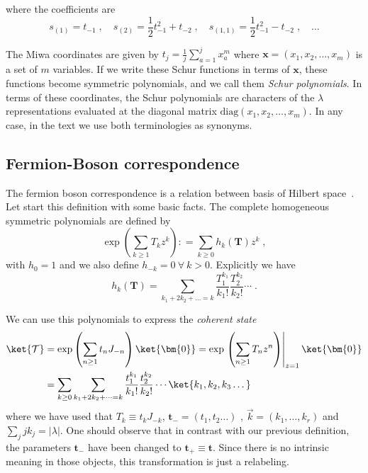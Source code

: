 where the coefficients are
\begin{equation}
s_{(1)}=t_{-1}\; , \quad s_{(2)}=\frac{1}{2}t_{-1}^2 + t_{-2} \; ,\quad s_{(1,1)}
=\frac{1}{2}t_{-1}^2- t_{-2}\; ,\quad  \dots
\end{equation}

The Miwa coordinates are given by \(t_j = \frac{1}{j}\sum_{a = 1}^j
x_a^m\) where \(\bm{x} = (x_1, x_2, \dots, x_m)\) is a set of \(m\)
variables. If we write these Schur functions in terms of \(\bm{x}\),
these functions become symmetric polynomials, and we call them
\emph{Schur polynomials}. In terms of these coordinates, the Schur
polynomials are characters of the \(\lambda\) representations
evaluated at the diagonal matrix \(\mathrm{diag}(x_1, x_2, \dots,
x_m)\). In any case, in the text we use both terminologies as
synonyms.


\subsection{Fermion-Boson correspondence}

The fermion boson correspondence is a relation between basis of
Hilbert space~\cite{Cordes:1994fc, Marino:2005sj}. Let start this
definition with some basic facts. The complete homogeneous symmetric
polynomials are defined by
\begin{equation}
  \label{eq:com-hom-sym-pol}
\exp\left(\sum_{k\geq 1} T_k z^k\right): = \sum_{k\geq 0} h_k(\bm{T}) z^k \; ,
\end{equation}
with \(h_0=1\) and we also define \(h_{-k}=0\  \forall\ k>0\). Explicitly we have 
\begin{equation}
  h_k(\bm{T}) = \sum_{k_1+2k_2 +\dots = k}\frac{T_1^{k_1}}{k_1!} \frac{T_2^{k_2}}{k_2!}\cdots
  \; .
\end{equation}	

We can use this polynomials to express the \emph{coherent state}
\begin{equation}
\begin{split}
  \ket{\mathcal{T}}& = \exp\left( \sum_{n\geq 1} t_{n} J_{-n}\right) \ket{\bm{0}} = 
  \exp\left.\left(\sum_{n\geq 1} T_n z^n\right)\right|_{z=1}  \ket{\bm{0}} \\
& = \sum_{k\geq 0} \sum_{k_1+2k_2+\cdots = k}\frac{t_{1}^{k_1}}{k_1!}
\frac{t_{2}^{k_2}}{k_2!}\cdots \ket{k_1, k_2, k_3\dots}
\end{split}
\end{equation}
where we have used that \(T_k \equiv t_k J_{-k}\), \(\bm{t}_- = (t_1,
t_2 \dots)\) , \(\vec{k} = (k_1, \dots, k_r)\) and \(\sum_j j k_j =
|\lambda|\).  One should observe that in contrast with our previous
definition, the parameters \(\bm{t}_-\) have been changed to
\(\bm{t}_+\equiv \bm{t}\). Since there is no intrinsic meaning in those objects,
this transformation is just a relabeling.

